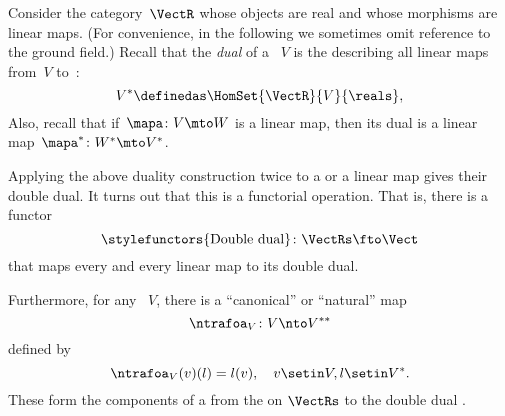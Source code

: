 \begin{example}
    \label{ex:Vect}
    Consider the category~$\VectR$ whose objects are real  and whose morphisms are linear maps.
    (For convenience, in the following we sometimes omit reference to the ground field.)
    Recall that the \emph{dual} of a ~$V$ is the  describing all linear maps from~$V$ to~\reals:
    \begin{equation}
        \label{eq:dual-vector-space}
        V^* \definedas \HomSet{\VectR}{V}{\reals},
    \end{equation}
    Also, recall that if~$\mapa\colon V \mto W$ is a linear map, then its dual is a linear map~$\mapa^* \linebreak[1] \colon W^* \mto V^*$.

    Applying the above duality construction twice to a  or a linear map gives their double dual.
    It turns out that this is a functorial operation.
    That is, there is a functor
    \begin{equation}
        \label{eq:double-dual-functor}
        \text{\stylefunctors{Double dual}}\colon \VectRs \fto \Vect
    \end{equation}
    that maps every  and every linear map to its double dual.

    Furthermore, for any ~$V$, there is a ``canonical'' or ``natural'' map
    \begin{equation}
        \ntrafoa_V \colon V \nto V^{**}
    \end{equation}
    defined by
    \begin{equation}
        \label{eq:natural-trafo-to-double-dual}
        \ntrafoa_V(v)(l) = l(v), \quad v \setin V, l \setin V^*.
    \end{equation}
    These form the components of a  from the  on $\VectRs$ to the double dual .

\end{example}

